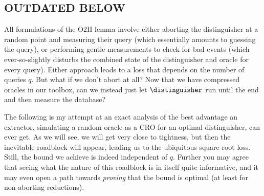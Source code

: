   \ifdraftversion
  \subsection{OUTDATED BELOW}
  All formulations of the O2H lemma involve either aborting the distinguisher at a
    random point and measuring their query (which essentially amounts to
    guessing the query), or performing gentle measurements to check for bad
    events (which ever-so-slightly disturbs the combined state of the distinguisher and
    oracle for every query). Either approach leads to a loss that
    depends on the number of queries $q$.
    But what if we don't abort at all? Now that we have compressed oracles in
    our toolbox, can we instead just let $\distinguisher$ run until the
    end and then measure the database?
  
  The following is my attempt at an exact analysis of the best advantage
    an extractor, simulating a random oracle as a CRO for an optimal
    distinguisher, can ever get. As we will see, we will get very
    close to tightness, but then the inevitable
    roadblock will appear, leading us to the ubiquitous square root loss. 
    Still, the bound we achieve is indeed independent of $q$.
    Further you may agree that seeing what the nature of this roadblock is in
    itself quite informative,
    and it may even open a path towards \emph{proving} that the bound is optimal
    (at least for non-aborting reductions).



